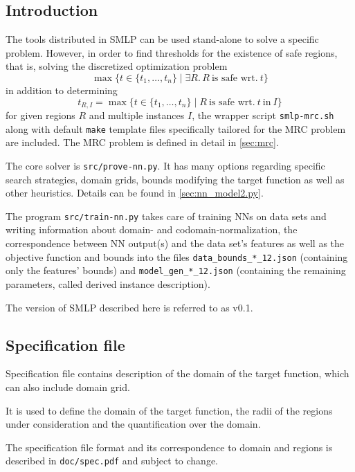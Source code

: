 \documentclass[a4paper,parskip=half]{article} %
\newcommand*\cmdstyle\texttt
\newcommand*\file\cmdstyle
\newcommand*\cmd[1]{\cmdstyle{\textcolor{red!85!black}{#1}}}
\newcommand*\SolverAbbrvText{SMLP}
\newcommand*\SolverAbbrv{\SolverAbbrvText\xspace}
\newcommand*\SolverVersion{v0.1}
\newcommand*\progmrc{smlp-mrc.sh}
\newcommand*\provenn{prove-nn.py}
\newcommand*\trainnn{train-nn.py}
\begin{document}
{\subsection{Introduction}
The tools distributed in \SolverAbbrv can be used stand-alone to solve a
specific problem. However, in order to find thresholds for the existence of safe
regions, that is, solving the discretized optimization problem
\[ \max\{t\in\{t_1,\ldots,t_n\}\mid \exists R.\,R~\text{is safe wrt.}~t\} \]
in addition to determining
\[ t_{R,I}=\max\{t\in\{t_1,\ldots,t_n\}\mid R~\text{is safe wrt.}~t~\text{in}~I\} \]
for given regions $R$ and multiple instances $I$,
the wrapper script \cmd{\progmrc} along with default \cmd{make} template
files specifically tailored for the MRC problem are included.
The MRC problem is defined in detail in \cref{sec:mrc}.

The core solver is \cmd{src/\provenn}. It has many options regarding
specific search strategies, domain grids, bounds modifying the target function
as well as other heuristics. Details can be found in \cref{sec:nn_model2.py}.

The program \cmd{src/\trainnn} takes care of training NNs on data
sets and writing information about domain- and codomain-normalization, the
correspondence between NN output(s) and the data set's features as well as
the objective function and bounds into the files \file{data\_bounds\_*\_12.json}
(containing only the features' bounds) and \file{model\_gen\_*\_12.json}
(containing the remaining parameters, called derived instance description).

The version of \SolverAbbrv described here is referred to as \SolverVersion.


\subsection{Specification file}\label{sec:.spec}
Specification file contains description of the domain of the target function, which  can also include domain grid. 

It is used to define the domain of the target function, the radii of the
regions under consideration and the quantification over the domain.

The specification file format and its correspondence to domain and regions is
described in \file{doc/spec.pdf} and subject to change.


}
\end{document}
